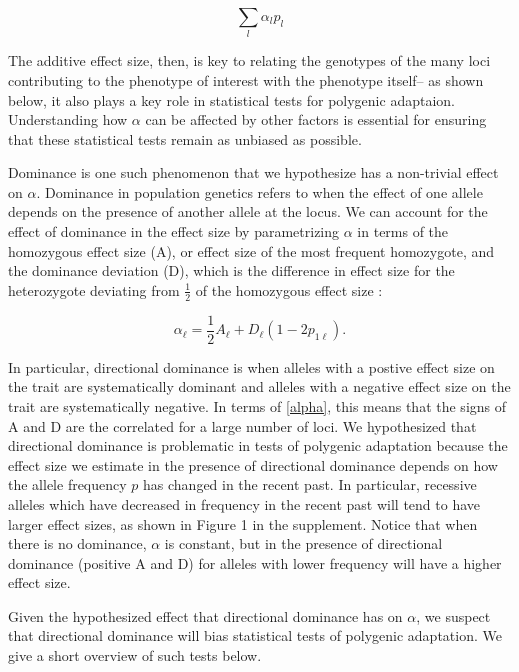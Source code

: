 \documentclass[a4paper,12pt]{article}
\begin{document}
\begin{equation}
  \sum_l{\alpha_lp_l}
\end{equation}

The additive effect size, then, is key to relating the genotypes of
the many loci contributing to the phenotype of interest with the
phenotype itself-- as shown below, it also plays a key role in statistical tests for
polygenic adaptaion. Understanding how $\alpha$ can be
affected by other factors is essential for ensuring that these
statistical tests remain as unbiased as possible. 

Dominance is one such phenomenon that we hypothesize has a non-trivial
effect on $\alpha$. Dominance in population genetics refers to when the effect of one
allele depends on the presence of another allele at the locus. We can account for
the effect of dominance in the effect size by parametrizing $\alpha$
in terms of the homozygous effect size (A), or effect size of the most frequent homozygote, and the
dominance deviation (D), which is the difference in effect size for the heterozygote
deviating from $\frac{1}{2}$ of the homozygous effect size \cite{gillespie}:

\begin{equation}  
  \alpha_\ell = \frac{1}{2} A_\ell + D_\ell\left(1-2p_{1\ell}\right).
  \label{alpha}
\end{equation}

In particular, directional dominance is when alleles with a postive effect
size on the trait are systematically dominant and alleles with a
negative effect size on the trait are systematically negative. In
terms of \eqref{alpha}, this means that the signs of A and D are the
correlated for a large number of loci. We hypothesized that
directional dominance is problematic in tests of polygenic adaptation
because the effect size we estimate in the presence of directional
dominance depends on how the allele frequency $p$ has changed in the
recent past. In particular, recessive alleles which have decreased in frequency
in the recent past will tend to have larger effect sizes, as shown in
Figure 1 in the supplement. Notice that when there is no dominance,
$\alpha$ is constant, but in the presence of directional dominance
(positive A and D) for alleles with lower frequency will have a higher
effect size. 

Given the hypothesized effect that directional dominance has on
$\alpha$, we suspect that directional dominance will bias statistical
tests of polygenic adaptation. We give a short overview of such tests
below.  
\end{document}
